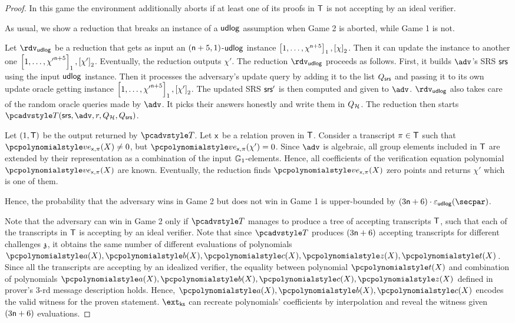 \begin{proof}
  In this game the environment additionally aborts if at least one of its proofs in $\mathsf{T}$ is not accepting by an ideal verifier.

  As usual, we show a reduction that breaks an instance of a $\mathsf{udlog}$ assumption when Game 2 is aborted, while Game 1 is not.

  Let $\rdvudlog$ be a reduction that gets as input an $(\mathsf{n} + 5, 1)$-$\mathsf{udlog}$ instance $\left[1, \ldots, \chi^{\mathsf{n} + 5}\right]_{1}, \left[\chi\right]_{2}$. Then it can update the instance to another one $\left[1, \ldots, {\chi'}^{\mathsf{n} + 5}\right]_{1}, \left[\chi'\right]_{2}$. Eventually, the reduction outputs $\chi'$.
	The reduction $\rdvudlog$ proceeds as follows.
	First, it builds $\adv$'s SRS $\mathsf{srs}$ using the input $\mathsf{udlog}$ instance. Then it processes the adversary's update query by adding it to the list $Q_{\mathsf{srs}}$ and passing it to its own update oracle getting instance $\left[1, \ldots, {\chi'}^{\mathsf{n} + 5}\right]_{1}, \left[\chi'\right]_{2}$. The updated SRS $\mathsf{srs}'$ is then computed and given to $\adv$. $\rdvdulog$ also takes care of the random oracle queries made by $\adv$. It picks their answers honestly and write them in $Q_{\mathcal{H}}$. The reduction then starts $\tdv(\srs, \adv, r, \Qro, \Qsrs)$.
	
  Let $(1, \mathsf{T})$ be the output returned by $\tdv$. Let $\mathsf{x}$ be a relation proven in $\mathsf{T}$.  Consider a transcript $\pi \in \mathsf{T}$ such that $\vereq_{\inp, \zkproof}(X) \neq 0$, but $\vereq_{\inp, \zkproof}(\chi') = 0$. Since $\adv$ is algebraic, all group elements included in $\mathsf{T}$ are extended by their representation as a combination of the input $\mathbb{G}_1$-elements. Hence, all coefficients of the verification equation polynomial $\vereq_{\inp, \zkproof}(X)$ are known. 
  Eventually, the reduction finds $\vereq_{\inp, \zkproof}(X)$ zero points and returns $\chi'$ which is one of them.
    
  Hence, the probability that the adversary wins in Game 2 but does not win in Game 1 is upper-bounded by $(3 \noofc + 6) \cdot \epsudlog (\secpar)$.


  Note that the adversary can win in Game 2 only if $\tdv$ manages to produce a tree of accepting transcripts $\mathsf{T}$, such that each of the transcripts in $\mathsf{T}$ is accepting by an ideal verifier. Note that since $\tdv$ produces $(3 \mathsf{n} + 6)$ accepting transcripts for different challenges $\mathfrak{z}$, it obtains the same number of different evaluations of polynomials $\p{a} (X), \p{b} (X), \p{c} (X), \p{z} (X), \p{t} (X)$. Since all the transcripts are accepting by an idealized verifier, the equality between polynomial $\p{t} (X)$ and combination of polynomials $\p{a} (X), \p{b} (X), \p{c} (X), \p{z} (X)$ defined in prover's $3$-rd message description holds. Hence, $\p{a} (X), \p{b} (X), \p{c} (X)$ encodes the valid witness for the proven statement. $\extcss$ can recreate polynomials' coefficients by interpolation and reveal the witness given $(3 \mathsf{n} + 6)$ evaluations. 



\end{proof}
